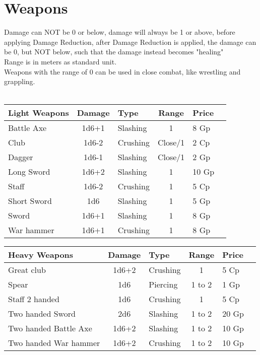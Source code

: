 \chapter{Weapons}
Damage can NOT be 0 or below, damage will always be 1 or above, before applying Damage Reduction, after Damage Reduction is applied, the damage can be 0, but NOT below, such that the damage instead becomes "healing"\\
Range is in meters as standard unit.\\
Weapons with the range of 0 can be used in close combat, like wrestling and grappling.\\\\


\begin{tabular}{|l|c|l|c|l|c|}\hline
\rowcolor{gray!50}
    \textbf{Light Weapons}&\textbf{Damage}&\textbf{Type}&\textbf{Range}&\textbf{Price}  \\ \hline
    Battle Axe  & 1d6+1 & Slashing  & 1         & 8 Gp      \\ 
    Club        & 1d6-2 & Crushing  & Close/1   & 2 Cp      \\ 
    Dagger      & 1d6-1 & Slashing  & Close/1   & 2 Gp      \\ 
    Long Sword  & 1d6+2 & Slashing  & 1         & 10 Gp     \\ 
    Staff       & 1d6-2 & Crushing  & 1         & 5 Cp      \\ 
    Short Sword & 1d6   & Slashing  & 1         & 5 Gp      \\
    Sword       & 1d6+1 & Slashing  & 1         & 8 Gp      \\
    War hammer  & 1d6+1 & Crushing  & 1         & 8 Gp      \\
    \hline
\end{tabular}
\newline
\newline
\newline

\begin{tabular}{|l|c|l|c|l|c|}\hline
\rowcolor{gray!50}
    \textbf{Heavy Weapons}&\textbf{Damage}&\textbf{Type}&\textbf{Range}&\textbf{Price} \\ \hline
    Great club              & 1d6+2 & Crushing  & 1         & 5 Cp      \\ 
    Spear                   & 1d6   & Piercing  & 1 to 2    & 1 Gp      \\ 
    Staff 2 handed          & 1d6   & Crushing  & 1         & 5 Cp      \\ 
    Two handed Sword        & 2d6   & Slashing  & 1 to 2    & 20 Gp     \\ 
    Two handed Battle Axe   & 1d6+2 & Slashing  & 1 to 2    & 10 Gp      \\ 
    Two handed War hammer   & 1d6+2 & Crushing  & 1 to 2    & 10 Gp      \\ 
    \hline
\end{tabular}
\quad
\newline
\newline
\newline

